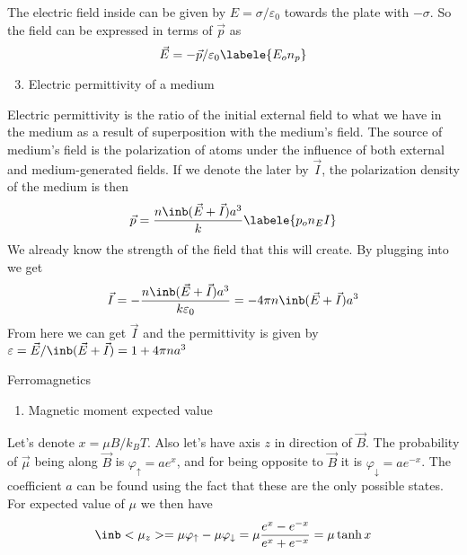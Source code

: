 \begin{enumerate}
\hspace{.5cm}
The electric field inside can be given by $E = \sigma / \varepsilon_0$
towards the plate with $-\sigma$.
So the field can be expressed in terms of $\vec{p}$ as
\begin{equation}    
    \vec{E} = -\vec{p} / \varepsilon_0
    \labele{E_on_p}
\end{equation}

\begin{enumerate}
    \setcounter{enumii}{2}
    \item Electric permittivity of a medium
\end{enumerate}

\hspace{.5cm}
Electric permittivity is the ratio of the initial external field
to what we have in the medium as a result of superposition with the medium's field.
The source of medium's field is the polarization of atoms
under the influence of both external and medium-generated fields.
If we denote the later by $\vec{I}$,
the polarization density of the medium is then
\begin{equation}
    \vec{p} = \frac{n \inb({\vec{E} + \vec{I}}) a^3}{k}
    \labele{p_on_EI}
\end{equation}
We already know the strength of the field that this will create.
By plugging  into  we get
\begin{equation}
    \vec{I} = -\frac{n \inb({\vec{E} + \vec{I}}) a^3}{k \varepsilon_0}=
        -4\pi n \inb({\vec{E} + \vec{I}}) a^3
\end{equation} 
From here we can get $\vec{I}$ and
the permittivity is given by
$\varepsilon = \vec{E} / \inb({\vec{E} + \vec{I}}) = 1 + 4 \pi n a^3$

{\bfseries
\item Ferromagnetics
}

\begin{enumerate}
    \item Magnetic moment expected value
\end{enumerate}

\hspace{.5cm}
Let's denote $x = \mu B / k_B T$.
Also let's have axis $z$ in direction of $\vec{B}$.
The probability of $\vec{\mu}$ being along $\vec{B}$
is $\varphi_{\uparrow} = a e^x$, and for being opposite to $\vec{B}$
it is $\varphi_{\downarrow} = a e^{-x}$.
The coefficient $a$ can be found using the fact
that these are the only possible states.
For expected value of $\mu$ we then have
\begin{equation}
    \inb<{\mu_z}> = \mu \varphi_{\uparrow} - \mu \varphi_{\downarrow} = 
    \mu \frac{e^x - e^{-x}}{e^x + e^{-x}} = \mu \tanh{x}
\end{equation}


\end{enumerate}
